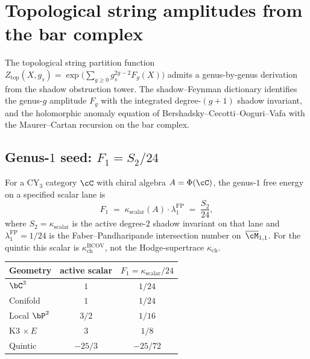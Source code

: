 \section{Topological string amplitudes from the bar complex}
\label{sec:topological-string-from-bar}

The topological string partition function $Z_{\mathrm{top}}(X, g_s) = \exp\bigl(\sum_{g \geq 0} g_s^{2g-2} F_g(X)\bigr)$ admits a genus-by-genus derivation from the shadow obstruction tower. The shadow--Feynman dictionary identifies the genus-$g$ amplitude $F_g$ with the integrated degree-$(g+1)$ shadow invariant, and the holomorphic anomaly equation of Bershadsky--Cecotti--Ooguri--Vafa with the Maurer--Cartan recursion on the bar complex.

\subsection{Genus-\texorpdfstring{$1$}{1} seed: \texorpdfstring{$F_1 = S_2/24$}{F-1 = S-2/24}}
\label{subsec:genus-1-seed}

\begin{proposition}
\label{prop:f1-from-shadow}
For a CY$_3$ category $\cC$ with chiral algebra $A = \Phi(\cC)$, the genus-$1$ free energy on a specified scalar lane is
\[
 F_1 \;=\; \kappa_{\mathrm{scalar}}(A) \cdot \lambda_1^{\mathrm{FP}} \;=\; \frac{S_2}{24},
\]
where $S_2 = \kappa_{\mathrm{scalar}}$ is the active degree-$2$ shadow invariant on that lane and $\lambda_1^{\mathrm{FP}} = 1/24$ is the Faber--Pandharipande intersection number on~$\overline{\cM}_{1,1}$. For the quintic this scalar is $\kappa_{\mathrm{ch}}^{\mathrm{BCOV}}$, not the Hodge-supertrace $\kappa_{\mathrm{ch}}$.
\begin{center}
\renewcommand{\arraystretch}{1.2}
\small
\begin{tabular}{lcc}
 \toprule
 Geometry & active scalar & $F_1 = \kappa_{\mathrm{scalar}}/24$ \\
 \midrule
 $\bC^3$ & $1$ & $1/24$ \\
 Conifold & $1$ & $1/24$ \\
 Local $\bP^2$ & $3/2$ & $1/16$ \\
 K3 $\times\, E$ & $3$ & $1/8$ \\
 Quintic & $-25/3$ & $-25/72$ \\
 \bottomrule
\end{tabular}
\end{center}
\end{proposition}

